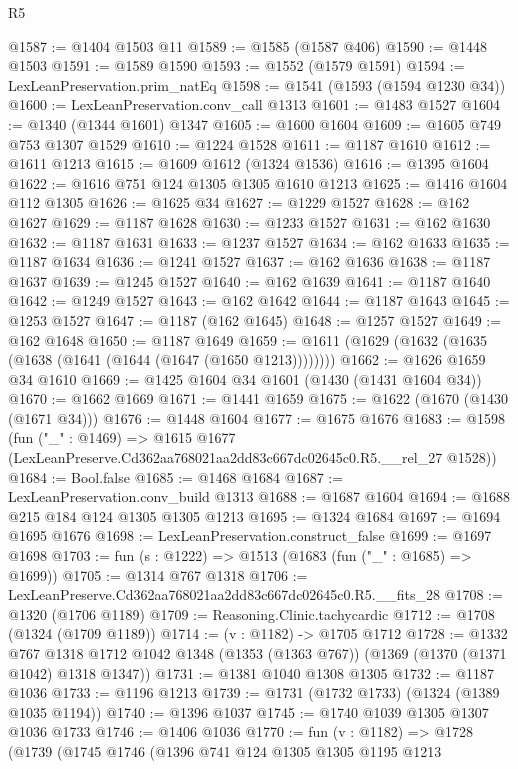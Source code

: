 \begin{lexlean}{R5}
\begin{coremodule}
@1587 := @1404 @1503 @11
@1589 := @1585 (@1587 @406)
@1590 := @1448 @1503
@1591 := @1589 @1590
@1593 := @1552 (@1579 @1591)
@1594 := LexLeanPreservation.prim_natEq
@1598 := @1541 (@1593 (@1594 @1230 @34))
@1600 := LexLeanPreservation.conv_call @1313
@1601 := @1483 @1527
@1604 := @1340 (@1344 @1601) @1347
@1605 := @1600 @1604
@1609 := @1605 @749 @753 @1307 @1529
@1610 := @1224 @1528
@1611 := @1187 @1610
@1612 := @1611 @1213
@1615 := @1609 @1612 (@1324 @1536)
@1616 := @1395 @1604
@1622 := @1616 @751 @124 @1305 @1305 @1610 @1213
@1625 := @1416 @1604 @112 @1305
@1626 := @1625 @34
@1627 := @1229 @1527
@1628 := @162 @1627
@1629 := @1187 @1628
@1630 := @1233 @1527
@1631 := @162 @1630
@1632 := @1187 @1631
@1633 := @1237 @1527
@1634 := @162 @1633
@1635 := @1187 @1634
@1636 := @1241 @1527
@1637 := @162 @1636
@1638 := @1187 @1637
@1639 := @1245 @1527
@1640 := @162 @1639
@1641 := @1187 @1640
@1642 := @1249 @1527
@1643 := @162 @1642
@1644 := @1187 @1643
@1645 := @1253 @1527
@1647 := @1187 (@162 @1645)
@1648 := @1257 @1527
@1649 := @162 @1648
@1650 := @1187 @1649
@1659 := @1611 (@1629 (@1632 (@1635 (@1638 (@1641 (@1644 (@1647 (@1650 @1213))))))))
@1662 := @1626 @1659 @34 @1610
@1669 := @1425 @1604 @34 @1601 (@1430 (@1431 @1604 @34))
@1670 := @1662 @1669
@1671 := @1441 @1659
@1675 := @1622 (@1670 (@1430 (@1671 @34)))
@1676 := @1448 @1604
@1677 := @1675 @1676
@1683 := @1598
    (fun ("_" : @1469) =>
    @1615 @1677 (LexLeanPreserve.Cd362aa768021aa2dd83c667dc02645c0.R5.__rel_27 @1528))
@1684 := Bool.false
@1685 := @1468 @1684
@1687 := LexLeanPreservation.conv_build @1313
@1688 := @1687 @1604
@1694 := @1688 @215 @184 @124 @1305 @1305 @1213
@1695 := @1324 @1684
@1697 := @1694 @1695 @1676
@1698 := LexLeanPreservation.construct_false
@1699 := @1697 @1698
@1703 := fun (s : @1222) => @1513 (@1683 (fun ("_" : @1685) => @1699))
@1705 := @1314 @767 @1318
@1706 := LexLeanPreserve.Cd362aa768021aa2dd83c667dc02645c0.R5.__fits_28
@1708 := @1320 (@1706 @1189)
@1709 := Reasoning.Clinic.tachycardic
@1712 := @1708 (@1324 (@1709 @1189))
@1714 := (v : @1182) -> @1705 @1712
@1728 := @1332
    @767
    @1318
    @1712
    @1042
    @1348
    (@1353 (@1363 @767))
    (@1369 (@1370 (@1371 @1042) @1318 @1347))
@1731 := @1381 @1040 @1308 @1305
@1732 := @1187 @1036
@1733 := @1196 @1213
@1739 := @1731 (@1732 @1733) (@1324 (@1389 @1035 @1194))
@1740 := @1396 @1037
@1745 := @1740 @1039 @1305 @1307 @1036 @1733
@1746 := @1406 @1036
@1770 := fun (v : @1182) =>
  @1728
    (@1739
      (@1745
        @1746
        (@1396
          @741
          @124
          @1305
          @1305
          @1195
          @1213

\end{coremodule}
\end{lexlean}
